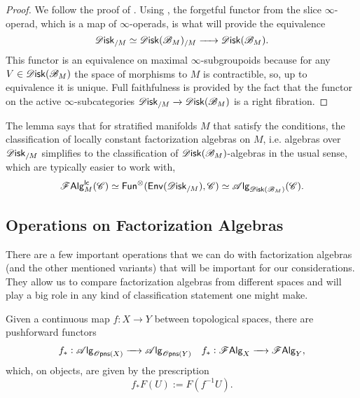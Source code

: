 \documentclass[../text]{subfiles}
\begin{document}
\begin{proof}
    We follow the proof of \cite[cor.2.33]{aft_fhstrat}. Using , the forgetful functor from the slice $\infty$-operad, which is a map of $\infty$-operads, is what will provide the equivalence
    \begin{equation}
        \disk_{/M} \simeq \disk(\bstr_M)_{/M} \xrightarrow{\ \ \ \ } \disk(\bstr_M).
    \end{equation}
    This functor is an equivalence on maximal $\infty$-subgroupoids because for any $V \in \disk(\bstr_M)$ the space of morphisms to $M$ is contractible, so, up to equivalence it is unique. Full faithfulness is provided by the fact that the functor on the active $\infty$-subcategories $\disk_{/M} \xrightarrow{} \disk(\bstr_M)$ is a right fibration. 
\end{proof}

The lemma says that for stratified manifolds $M$ that satisfy the conditions, the classification of locally constant factorization algebras on $M$, i.e. algebras over $\disk_{/M}$ simplifies to the classification of $\disk(\bstr_M)$-algebras in the usual sense, which are typically easier to work with,
%
\begin{equation}
    \lcfa_M (\catC) \simeq \mathsf{Fun}^\otimes (\mathsf{Env}(\disk_{/M}), \catC) \simeq \alg{\disk(\bstr_M)} (\catC).
\end{equation}

\subsection{Operations on Factorization Algebras}

There are a few important operations that we can do with factorization algebras (and the other mentioned variants) that will be important for our considerations. They allow us to compare factorization algebras from different spaces and will play a big role in any kind of classification statement one might make.


\begin{proposition}\label{prop:pushforward}
    Given a continuous map $f:X \rightarrow Y$ between topological spaces, there are pushforward functors
    \begin{align}
        &f_*: \alg{\opens[s](X)} \xrightarrow{\quad} \alg{\opens[s](Y)} &f_*: \falg_X \xrightarrow{\quad} \falg_Y,
    \end{align}
    which, on objects, are given by the prescription
    \begin{equation}
        f_*F (U) := F(f^{-1}U).
    \end{equation}
\end{proposition}
\end{document}
